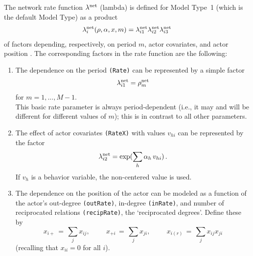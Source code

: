 \documentclass[a4paper,fleqn,11pt]{article}
\newcommand{\+}{\, + \,}
\begin{document}
The network rate function $\lambda^{\rm net}$
(lambda) is defined for Model Type~1 (which is the default Model
Type) as a product \[ \lambda^{\rm net}_i(\rho, \alpha, x, m) =
\lambda^{\rm net}_{i1} \lambda^{\rm net}_{i2} \lambda^{\rm net}_{i3}
\] of factors depending, respectively, on period $m$, actor
covariates, and actor position \citep[see][p.\ 383]{Snijders01}. The
corresponding factors in the rate function are the following:
\begin{enumerate}
 \item The dependence on the period \texttt{(Rate)}
 can be represented by a simple factor
 \[ \lambda^{\rm net}_{i1} = \rho^{\rm net}_m \]
 for $m = 1, ..., M-1$.\\
 This basic rate parameter is always period-dependent (i.e.,
 it may and will be different for
 different values of $m$); this is in contrast to all other parameters.

 \item The effect of actor covariates \texttt{(RateX)} with values
 $v_{hi}$ can be represented by the factor
 \[ \lambda^{\rm net}_{i2} = \exp(\sum_h \alpha_h \, v_{hi})\,. \]
   If $v_{h}$ is a behavior variable, the non-centered value is used.

 \item The dependence on the position of the actor can be modeled
 as a function of the actor's out-degree \texttt{(outRate)},
 in-degree \texttt{(inRate)}, and number
 of reciprocated relations \texttt{(recipRate)}, the `reciprocated degrees'.
 Define these by
 \[ x_{i+} \,=\, \sum_j x_{ij}, \phantom{abcde} x_{+i} \,=\, \sum_j x_{ji},
                \phantom{abcde} x_{i(r)} \,=\, \sum_j x_{ij}x_{ji} \]
 (recalling that $x_{ii} = 0$ for all $i$).\\

\end{enumerate}
\end{document}
